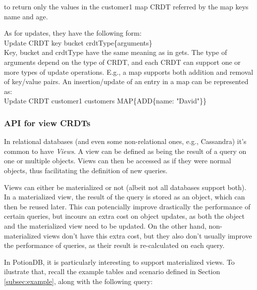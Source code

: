 \documentclass{vldb}
\begin{document}
to return only the values in the customer1 map CRDT referred by the map keys name and age.

As for updates, they have the following form: \\

Update CRDT key bucket crdtType\{arguments\} \\

Key, bucket and crdtType have the same meaning as in gets.
The type of arguments depend on the type of CRDT, and each CRDT can support one or more types of update operations. 
E.g., a map supports both addition and removal of key/value pairs.
An insertion/update of an entry in a map can be represented as: \\

Update CRDT customer1 customers MAP\{ADD\{name: "David"\}\} \\

\subsubsection{API for view CRDTs}

In relational databases (and even some non-relational ones, e.g., Cassandra) it's common to have \emph{Views}. 
A view can be defined as being the result of a query on one or multiple objects.
Views can then be accessed as if they were normal objects, thus facilitating the definition of new queries.

Views can either be materialized or not (albeit not all databases support both). %
In a materialized view, the result of the query is stored as an object, which can then be reused later.
This can potencially improve drastically the performance of certain queries, but incours an extra cost on object updates, as both the object and the materialized view need to be updated.
On the other hand, non-materialized views don't have this extra cost, but they also don't usually improve the performance of queries, as their result is re-calculated on each query.

In PotionDB, it is particularly interesting to support materialized views.
To ilustrate that, recall the example tables and scenario defined in Section \ref{subsec:example}, along with the following query: 
\end{document}
